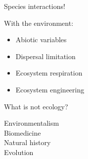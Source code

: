 \documentclass[12pt]{beamer}
\begin{document}
\begin{frame}

	\begin{flushright}
	  {\Large \textcolor{boss2}{Species interactions!}}
	\end{flushright}

  With the environment:

  \begin{itemize}
    \item Abiotic variables
    \item Dispersal limitation
    \item Ecosystem respiration 
    \item Ecosystem engineering
  \end{itemize}  
\end{frame}



















\begin{frame}

  {\Large  \textcolor{boss1}{What is not ecology?}} \\

\end{frame}






\begin{frame}

	\begin{flushright}
	  \Large \textcolor{boss2}{Environmentalism} \\
	  \Large \textcolor{boss3}{Biomedicine} \\
	  \Large \textcolor{boss4}{Natural history} \\
	  \Large \textcolor{boss5}{Evolution} \\
	\end{flushright}
\end{frame}
\end{document}
